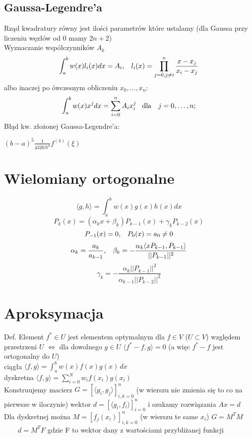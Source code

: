 \documentclass[twocolumn]{article}
\begin{document}
\begin{flushleft}
\subsection{Gaussa-Legendre’a}
Rząd kwadratury równy jest ilości parametrów które ustalamy (dla Gaussa przy liczeniu węzłów od 0 mamy $2n+2$)\\
Wyznaczanie współczynników $A_k$ \\
$$
\int^b_a w(x)l_i(x)dx=A_i, \hspace{3mm} l_i(x)=\prod_{j=0,j\neq i}^{n}\frac{x-x_j}{x_i-x_j}
$$
albo inaczej po ówczesnym obliczeniu $x_0,\dotsc,x_n$:\\
$$
\int^b_a w(x)x^jdx=\sum_{i=0}^nA_ix_i^j \hspace{3mm} \text{dla} \ \ \ j = 0 ,\dotsc, n;
$$
Błąd kw. złożonej Gaussa-Legendre’a:\\
\begin{center}
$(b-a)^5\frac{1}{4320N^4}f^{(4)}(\xi)$
\end{center}

\section{Wielomiany ortogonalne}
$$\langle g,h\rangle= \int_{a}^{b} w(x)g(x)h(x)dx$$
$$P_k (x) = ( \alpha_k x + \beta_k )P_{k-1} (x) + \gamma_k P_{k-2} (x)$$
$$P_{-1} (x) = 0, \hspace{3mm} P_0 (x) = a_0 \neq 0$$
$$\alpha_k = \frac{ a_k }{ a_{k-1} },\hspace{3mm} \beta_k = -\frac{ \alpha_k  \langle xP_{k-1} , P_{k-1} \rangle } { ||P_{k-1}||^2 }$$
$$ \gamma_k = -\frac{ \alpha_k ||P_{k-1}||^2}{ \alpha_{k-1} ||P_{k-2}||^2}$$

\section{Aproksymacja}
Def. Element $f^* \in U$ jest elementem optymalnym dla $f\in V$ ($U \subset V$) względem przestrzeni $U$ $\iff$ dla dowolnego $g \in U$ $\langle f^* -f,g\rangle = 0$ (a więc $f^* -f$ jest ortogonalny do $U$)\\
\vspace{3mm}
ciągła $\langle f,g \rangle = \int_a^b w(x)f(x)g(x) \,dx$\\
dyskretna $\langle f,g \rangle = \sum_{i=0}^Nw_if(x_i)g(x_i)$\\\vspace{3mm}
Konstruujemy macierz $G = \left[\langle g_i,g_j \rangle\right]_{i,k = 0}^n$ (w wierszu nie zmienia się to co na pierwsze w iloczynie) wektor $d = \left[\langle g_i, f_i\rangle \right]_{i = 0}^n$ i szukamy rozwiązania $Ax=d$\\
Dla dyskretnej można $M = \left[f_j(x_i)\right]_{i,k = 0}^n$ (w wierszu te same $x_i$) $G = M^TM$ \ \ \ \  $d = M^TF$ gdzie F to wektor dany z wartościami przybliżanej funkcji

\end{flushleft}
\end{document}

